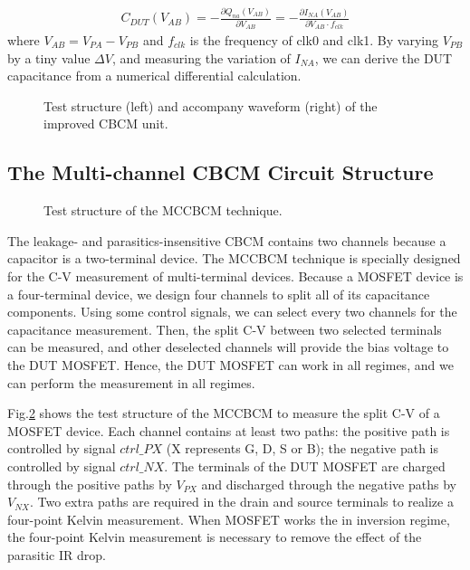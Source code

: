 \documentclass[journal]{IEEEtran}
\begin{document}
\begin{align}
  C_{DUT}(V_{AB})=-\frac{\partial Q_{na}(V_{AB})}{\partial V_{AB}}=-\frac{\partial I_{NA}(V_{AB})}{\partial V_{AB}\cdot f_{clk}}
\end{align}
where $V_{AB}=V_{PA}-V_{PB}$ and $f_{clk}$ is the frequency of clk0 and clk1. By varying $V_{PB}$ by a tiny value $\Delta V$, and measuring the variation of $I_{NA}$, we can derive the DUT capacitance from a numerical differential calculation.


\begin{figure}
\caption{Test structure (left) and accompany waveform (right) of the improved CBCM unit. }
\label{Fig1}
\end{figure}




\subsection{The Multi-channel CBCM Circuit Structure}

\begin{figure}
\caption{Test structure of the MCCBCM technique. }
\label{Fig2}
\end{figure}




The leakage- and parasitics-insensitive CBCM contains two channels because a capacitor is a two-terminal device. The MCCBCM technique is specially designed for the C-V measurement of multi-terminal devices. Because a MOSFET device is a four-terminal device, we design four channels to split all of its capacitance components. Using some control signals, we can select every two channels for the capacitance measurement. Then, the split C-V between two selected terminals can be measured, and other deselected channels will provide the bias voltage to the DUT MOSFET. Hence, the DUT MOSFET can work in all regimes, and we can perform the measurement in all regimes.  

Fig.\ref{Fig2} shows the test structure of the MCCBCM to measure the split C-V of a MOSFET device. Each channel contains at least two paths: the positive path is controlled by signal $ctrl\_PX$ (X represents G, D, S or B); the negative path is controlled by signal $ctrl\_NX$. The terminals of the DUT MOSFET are charged through the positive paths by $V_{PX}$ and discharged through the negative paths by $V_{NX}$. Two extra paths are required in the drain and source terminals to realize a four-point Kelvin measurement. When MOSFET works the in inversion regime, the four-point Kelvin measurement is necessary to remove the effect of the parasitic IR drop. 
\end{document}

